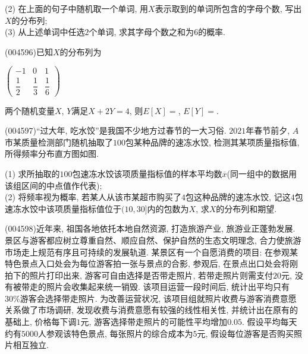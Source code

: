 (2) 在上面的句子中随机取一个单词, 用$X$表示取到的单词所包含的字母个数, 写出$X$的分布列;\\
(3) 从上述单词中任选$2$个单词, 求其字母个数之和为$6$的概率.
\item (004596)已知$X$的分布列为
\begin{center}
    $\begin{pmatrix}
        -1 & 0 & 1 \\ 
        \dfrac 12 & \dfrac 13 & \dfrac 16 
    \end{pmatrix}$
\end{center}
两个随机变量$X$, $Y$满足$X+2Y=4$, 则$E[X]=$, $E[Y]=$.
\item (004597)``过大年, 吃水饺''是我国不少地方过春节的一大习俗. $2021$年春节前夕, $A$市某质量检测部门随机抽取了$100$包某种品牌的速冻水饺, 检测其某项质量指标值, 所得频率分布直方图如图.
\begin{center}
\end{center}
(1) 求所抽取的$100$包速冻水饺该项质量指标值的样本平均数$\overline x$(同一组中的数据用该组区间的中点值作代表);\\
(2) 将频率视为概率, 若某人从该市某超市购买了$4$包这种品牌的速冻水饺, 记这$4$包速冻水饺中该项质量指标值位于$(10,30]$内的包数为$X$, 求$X$的分布列和期望.
\item (004598)近年来, 祖国各地依托本地自然资源, 打造旅游产业, 旅游业正蓬勃发展. 景区与游客都应树立尊重自然、顺应自然、保护自然的生态文明理念, 合力使旅游市场走上规范有序且可持续的发展轨道. 某景区有一个自愿消费的项目: 在参观某特色景点入口处会为每位游客拍一张与景点的合影, 参观后, 在景点出口处会将刚拍下的照片打印出来, 游客可自由选择是否带走照片, 若带走照片则需支付$20$元, 没有被带走的照片会收集起来统一销毁. 该项目运营一段时间后, 统计出平均只有$30\%$游客会选择带走照片. 为改善运营状况, 该项目组就照片收费与游客消费意愿关系做了市场调研, 发现收费与消费意愿有较强的线性相关性, 并统计出在原有的基础上, 价格每下调$1$元, 游客选择带走照片的可能性平均增加$0.05$. 假设平均每天约有$5000$人参观该特色景点, 每张照片的综合成本为$5$元, 假设每位游客是否购买照片相互独立.\\
